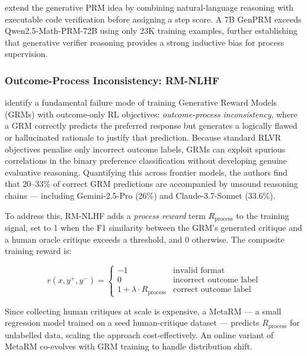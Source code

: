 \vspace{1em}
\autocite{zhao2025genprm} extend the generative PRM idea by combining natural-language reasoning with executable code verification before assigning a step score. A 7B GenPRM exceeds Qwen2.5-Math-PRM-72B using only 23K training examples, further establishing that generative verifier reasoning provides a strong inductive bias for process supervision.

\subsubsection{Outcome-Process Inconsistency: RM-NLHF}

\autocite{wang2026rmnlhf} identify a fundamental failure mode of training Generative Reward Models (GRMs) with outcome-only RL objectives: \textit{outcome-process inconsistency}, where a GRM correctly predicts the preferred response but generates a logically flawed or hallucinated rationale to justify that prediction. Because standard RLVR objectives penalise only incorrect outcome labels, GRMs can exploit spurious correlations in the binary preference classification without developing genuine evaluative reasoning. Quantifying this across frontier models, the authors find that 20--33\% of correct GRM predictions are accompanied by unsound reasoning chains --- including Gemini-2.5-Pro (26\%) and Claude-3.7-Sonnet (33.6\%).

To address this, RM-NLHF adds a \emph{process reward} term $R_{\mathrm{process}}$ to the training signal, set to 1 when the F1 similarity between the GRM's generated critique and a human oracle critique exceeds a threshold, and 0 otherwise. The composite training reward is:

\begin{equation}
    r(x, y^+, y^-) = \begin{cases} -1 & \text{invalid format} \\ 0 & \text{incorrect outcome label} \\ 1 + \lambda \cdot R_{\mathrm{process}} & \text{correct outcome label} \end{cases}
\end{equation}

Since collecting human critiques at scale is expensive, a MetaRM --- a small regression model trained on a seed human-critique dataset --- predicts $R_{\mathrm{process}}$ for unlabelled data, scaling the approach cost-effectively. An online variant of MetaRM co-evolves with GRM training to handle distribution shift.

